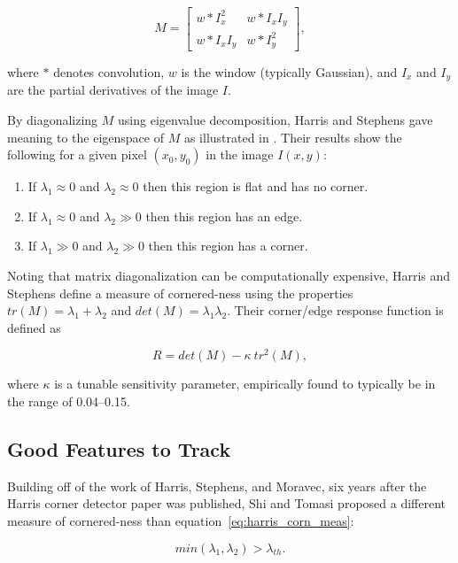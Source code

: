 \documentclass[hidelinks]{article}
\begin{document}
\begin{equation}
M =
\begin{bmatrix}
  w*I_x^2 & w*I_x I_y \\
  w*I_x I_y & w*I_y^2
\end{bmatrix},
\end{equation}

where $*$ denotes convolution, $w$ is the window (typically Gaussian), and $I_x$ and $I_y$ are the partial derivatives of the image $I$.

By diagonalizing $M$ using eigenvalue decomposition, Harris and Stephens gave meaning to the eigenspace of $M$ as illustrated in \cite[Figure~5]{Harris1988}. Their results show the following for a given pixel $(x_0, y_0)$ in the image $I(x, y)$:

\begin{enumerate}
  \item If $\lambda_1 \approx 0$ and $\lambda_2 \approx 0$ then this region is flat and has no corner.
  \item If $\lambda_1 \approx 0$ and $\lambda_2 \gg 0$ then this region has an edge.
  \item If $\lambda_1 \gg 0$ and $\lambda_2 \gg 0$ then this region has a corner.
\end{enumerate}

Noting that matrix diagonalization can be computationally expensive, Harris and Stephens define a measure of cornered-ness using the properties $tr(M) = \lambda_1 + \lambda_2$ and $det(M) = \lambda_1 \lambda_2$. Their corner/edge response function is defined as

\begin{equation}\label{eq:harris_corn_meas}
  R = det(M) - \kappa\ tr^2(M),
\end{equation}

where $\kappa$ is a tunable sensitivity parameter, empirically found to typically be in the range of \numrange{0.04}{0.15}.

\subsection{Good Features to Track}
Building off of the work of Harris, Stephens, and Moravec, six years after the Harris corner detector paper was published, Shi and Tomasi proposed a different measure of cornered-ness than equation~\ref{eq:harris_corn_meas}:

\begin{equation}
  min(\lambda_1, \lambda_2) > \lambda_{th}.
\end{equation}
\end{document}

